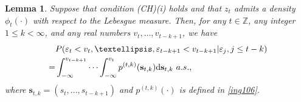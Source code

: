 \documentclass[ejsv2]{imsart}
\theoremstyle{plain}
\newtheorem{lemma}[theorem]{Lemma}
\theoremstyle{definition}
\theoremstyle{remark}
\begin{document}
\begin{lemma}\label{lm.condi pdf}
Suppose that condition (CH)(i) holds and that $z_t$
admits a density $\phi_t(\cdot)$ with respect to the Lebesgue measure. Then, for any $t\in\mathbb{Z}$, any integer $1\leq k <\infty$, and
any real numbers $v_t,\ldots,v_{t-k+1}$, we have
\begin{equation}\label{l.condi pdf.1}
\begin{split}
&P(\varepsilon_t<v_t,\ldots,\varepsilon_{t-k+1}<v_{t-k+1}|\varepsilon_{j},j\leq t-k)\\
=&\int_{-\infty}^{v_{t-k+1}}\cdots\int_{-\infty}^{v_t}p^{(t,k)}(\mathbf{s}_{t,k})\mathrm{d}\mathbf{s}_{t,k}\,\,{\rm a.s.},
\end{split}
\end{equation}
where $\mathbf{s}_{t,k}=(s_{t},\ldots,s_{t-k+1})$ and $p^{(t,k)}(\cdot)$ is defined in \eqref{ing106}.
\end{lemma}
\end{document}
